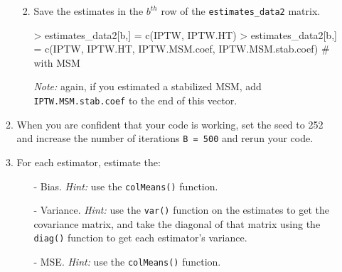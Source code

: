 \documentclass[answers]{exam}
\begin{document}
\begin{enumerate}
\begin{enumerate}
\begin{enumerate}
\begin{enumerate}
\end{enumerate}
\item Save the estimates in the $b^{th}$ row of the \texttt{estimates\_data2} matrix.
\begin{Schunk}
\begin{Sinput}
> estimates_data2[b,] = c(IPTW, IPTW.HT)
> estimates_data2[b,] = c(IPTW, IPTW.HT, IPTW.MSM.coef, IPTW.MSM.stab.coef) # with MSM
\end{Sinput}
\end{Schunk}
\textit{Note:} again, if you estimated a stabilized MSM, add \texttt{IPTW.MSM.stab.coef} to the end of this vector.
\end{enumerate}
\item When you are confident that your code is working, set the seed to 252 and increase the number of iterations \texttt{B = 500} and rerun your code. 
\item For each estimator, estimate the:
\begin{itemize}
\item[-] Bias. \textit{Hint:} use the \texttt{colMeans()} function.
\item[-] Variance. \textit{Hint:} use the \texttt{var()} function on the estimates to get the covariance matrix, and take the diagonal of that matrix using the \texttt{diag()} function to get each estimator's variance.
\item[-] MSE. \textit{Hint:} use the \texttt{colMeans()} function.
\end{itemize}
\end{enumerate}
\end{enumerate}
\end{document}

